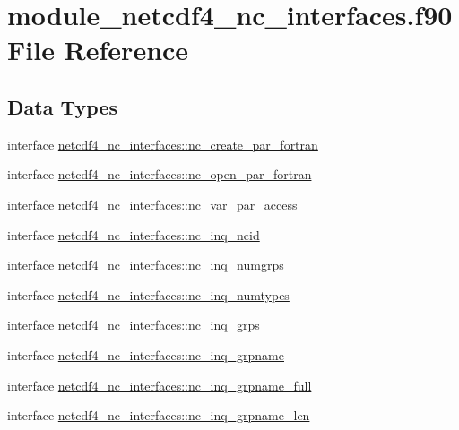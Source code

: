 \hypertarget{module__netcdf4__nc__interfaces_8f90}{}\section{module\+\_\+netcdf4\+\_\+nc\+\_\+interfaces.\+f90 File Reference}
\label{module__netcdf4__nc__interfaces_8f90}
\subsection*{Data Types}
\begin{DoxyCompactItemize}
\item 
interface \hyperlink{interfacenetcdf4__nc__interfaces_1_1nc__create__par__fortran}{netcdf4\+\_\+nc\+\_\+interfaces\+::nc\+\_\+create\+\_\+par\+\_\+fortran}
\item 
interface \hyperlink{interfacenetcdf4__nc__interfaces_1_1nc__open__par__fortran}{netcdf4\+\_\+nc\+\_\+interfaces\+::nc\+\_\+open\+\_\+par\+\_\+fortran}
\item 
interface \hyperlink{interfacenetcdf4__nc__interfaces_1_1nc__var__par__access}{netcdf4\+\_\+nc\+\_\+interfaces\+::nc\+\_\+var\+\_\+par\+\_\+access}
\item 
interface \hyperlink{interfacenetcdf4__nc__interfaces_1_1nc__inq__ncid}{netcdf4\+\_\+nc\+\_\+interfaces\+::nc\+\_\+inq\+\_\+ncid}
\item 
interface \hyperlink{interfacenetcdf4__nc__interfaces_1_1nc__inq__numgrps}{netcdf4\+\_\+nc\+\_\+interfaces\+::nc\+\_\+inq\+\_\+numgrps}
\item 
interface \hyperlink{interfacenetcdf4__nc__interfaces_1_1nc__inq__numtypes}{netcdf4\+\_\+nc\+\_\+interfaces\+::nc\+\_\+inq\+\_\+numtypes}
\item 
interface \hyperlink{interfacenetcdf4__nc__interfaces_1_1nc__inq__grps}{netcdf4\+\_\+nc\+\_\+interfaces\+::nc\+\_\+inq\+\_\+grps}
\item 
interface \hyperlink{interfacenetcdf4__nc__interfaces_1_1nc__inq__grpname}{netcdf4\+\_\+nc\+\_\+interfaces\+::nc\+\_\+inq\+\_\+grpname}
\item 
interface \hyperlink{interfacenetcdf4__nc__interfaces_1_1nc__inq__grpname__full}{netcdf4\+\_\+nc\+\_\+interfaces\+::nc\+\_\+inq\+\_\+grpname\+\_\+full}
\item 
interface \hyperlink{interfacenetcdf4__nc__interfaces_1_1nc__inq__grpname__len}{netcdf4\+\_\+nc\+\_\+interfaces\+::nc\+\_\+inq\+\_\+grpname\+\_\+len}
\item 

\end{DoxyCompactItemize}
